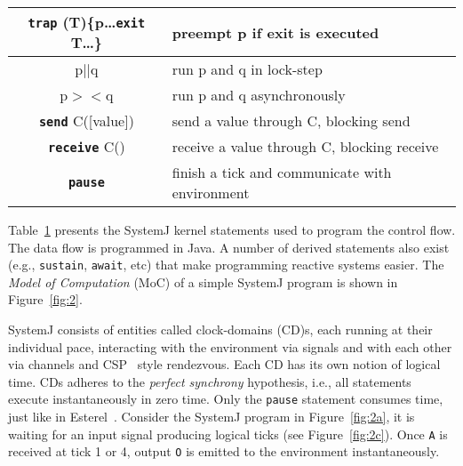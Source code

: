 \begin{table}[tb]
\begin{minipage}{8cm}
\begin{scriptsize}
\begin{tabular}{|c|p{80pt}|}
     \textbf{\texttt{trap}} (T)\{p\ldots \textbf{\texttt{exit}} T\ldots\} & preempt p if exit is executed\\                         
     \hline                                                                                     
     p\textbf{\texttt{$||$}}q & run p and q in lock-step\\                                                        
     \hline                                                                                     
     p$><$q & run p and q asynchronously\\                                                      
     \hline                                                                                     
     \textbf{\texttt{send}} C([value]) & send a value through C, blocking
     send\\                                                 
     \hline                                                                                     
     \textbf{\texttt{receive}} C() & receive a value through C, blocking
     receive\\
     \hline                                                                                     
     \textbf{\texttt{pause}} & finish a tick and communicate
     with environment\\
     \hline                                                                                     
   \end{tabular}
  \end{scriptsize}
 \end{minipage}
 \label{tab:1}
\end{table}

Table~\ref{tab:1} presents the SystemJ kernel statements used to program
the control flow. The data flow is programmed in Java. A number of
derived statements also exist (e.g., \texttt{sustain}, \texttt{await},
etc) that make programming reactive systems easier. The \textit{Model of
  Computation} (MoC) of a simple SystemJ program is shown in
Figure~\ref{fig:2}.

SystemJ consists of entities called clock-domains (CD)s, each running at
their individual pace, interacting with the environment via signals and
with each other via channels and CSP~\cite{choa85} style
rendezvous. Each CD has its own notion of logical time. CDs adheres to
the \textit{perfect synchrony} hypothesis, i.e., all statements execute
instantaneously in zero time. Only the \texttt{pause} statement consumes
time, just like in Esterel~\cite{gber931}. Consider the SystemJ program
in Figure~\ref{fig:2a}, it is waiting for an input signal producing
logical ticks (see Figure~\ref{fig:2c}). Once \texttt{A} is received at
tick 1 or 4, output \texttt{O} is emitted to the environment
instantaneously.

